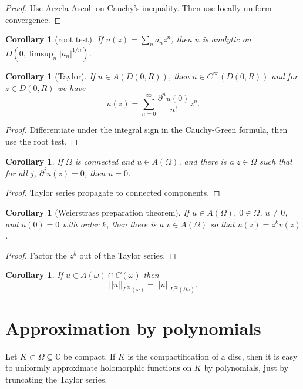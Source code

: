 \documentclass[12pt]{report}
\newcommand{\CC}{\mathbb{C}}
\newtheorem{corollary}[theorem]{Corollary}
\theoremstyle{definition}
\begin{document}
\begin{proof}
    Use Arzela-Ascoli on Cauchy's inequality. Then use locally uniform convergence.
\end{proof}
\begin{corollary}[root test]
    If $u(z) = \sum_n a_nz^n$, then $u$ is analytic on $D(0, \limsup_n |a_n|^{1/n})$.
\end{corollary}
\begin{corollary}[Taylor]
    If $u \in A(D(0, R))$, then $u \in C^\infty(D(0, R))$ and for $z \in D(0, R)$ we have
    $$u(z) = \sum_{n=0}^\infty \frac{\partial^n u(0)}{n!} z^n.$$
\end{corollary}
\begin{proof}
    Differentiate under the integral sign in the Cauchy-Green formula, then use the root test.
\end{proof}
\begin{corollary}
    If $\Omega$ is connected and $u \in A(\Omega)$, and there is a $z \in \Omega$ such that for all $j$, $\partial^ju(z) = 0$, then $u = 0$.
\end{corollary}
\begin{proof}
    Taylor series propagate to connected components.
\end{proof}
\begin{corollary}[Weierstrass preparation theorem]
    If $u \in A(\Omega)$, $0 \in \Omega$, $u \neq 0$, and $u(0) = 0$ with order $k$, then there is a $v \in A(\Omega)$ so that $u(z) = z^k v(z)$.
\end{corollary}
\begin{proof}
    Factor the $z^k$ out of the Taylor series.
\end{proof}
\begin{corollary}
    If $u \in A(\omega) \cap C(\overline \omega)$ then
    $$||u||_{L^\infty(\omega)} = ||u||_{L^\infty(\partial \omega)}.$$
\end{corollary}

\section{Approximation by polynomials}
Let $K \subset \Omega \subseteq \CC$ be compact. If $K$ is the compactification of a disc, then it is easy to uniformly approximate holomorphic functions on $K$ by polynomials, just by truncating the Taylor series.
\end{document}
